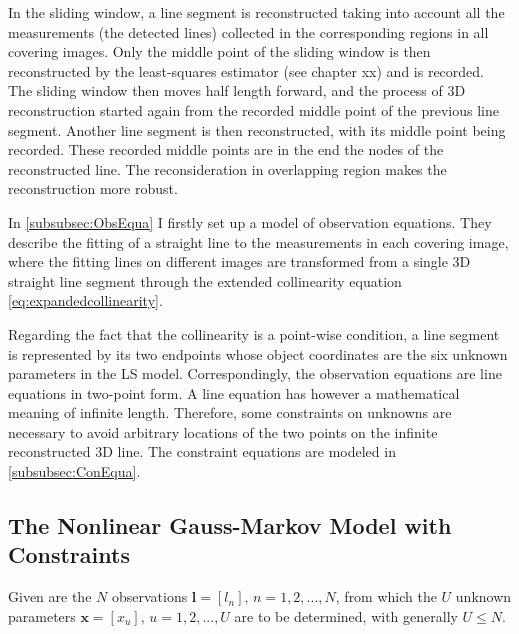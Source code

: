 In the sliding window, a line segment is reconstructed taking into account all the measurements (the detected lines) collected in the corresponding regions in all covering images. Only the middle point of the sliding window is then reconstructed by the least-squares estimator (see chapter xx) %
and is recorded. The sliding window then moves half length forward, and the process of 3D reconstruction started again from the recorded middle point of the previous line segment. Another line segment is then reconstructed, with its middle point being recorded. These recorded middle points are in the end the nodes of the reconstructed line. The reconsideration in overlapping region makes the reconstruction more robust.

In \cref{subsubsec:ObsEqua} I firstly set up a model of observation equations. They describe the fitting of a straight line to the measurements in each covering image, where the fitting lines on different images are transformed from a single 3D straight line segment through the extended collinearity equation \eqref{eq:expandedcollinearity}.

Regarding the fact that the collinearity is a point-wise condition, a line segment is represented by its two endpoints whose object coordinates are the six unknown parameters %
in the LS model. %
Correspondingly, the observation equations are line equations in two-point form. A line equation has however a mathematical meaning of infinite length. Therefore, some constraints on unknowns are necessary to avoid arbitrary locations of the two points on the infinite reconstructed 3D line. The constraint equations are modeled in \cref{subsubsec:ConEqua}.



\subsection{The Nonlinear Gauss-Markov Model with Constraints}
\label{GaussMarkovModelwithConstraints}

Given are the $N$ observations $\boldsymbol l=[l_n],\,n=1,2,...,N$, from which the $U$ unknown parameters $\boldsymbol x=[x_u],\,u=1,2,...,U$ are to be determined, with generally $U\leq N$.%

